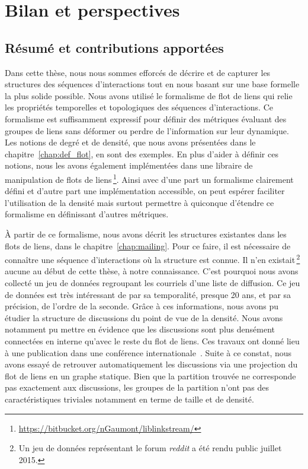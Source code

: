 \chapter{Bilan et perspectives}
\label{Conclusion}

\section{Résumé et contributions apportées}

Dans cette thèse, nous nous sommes efforcés de décrire et de capturer les structures des séquences d'interactions tout en nous basant sur une base formelle la plus solide possible.
Nous avons utilisé le formalisme de flot de liens qui relie les propriétés temporelles et topologiques des séquences d'interactions.
Ce formalisme est suffisamment expressif pour définir des métriques évaluant des groupes de liens sans déformer ou perdre de l'information sur leur dynamique.
Les notions de degré et de densité, que nous avons présentées dans le chapitre~\ref{chap:def_flot}, en sont des exemples.
En plus d'aider à définir ces notions, nous les avons également implémentées dans une libraire de manipulation de flots de liens\,\footnote{\url{https://bitbucket.org/nGaumont/liblinkstream/}}.
Ainsi avec d'une part un formalisme clairement défini et d'autre part une implémentation accessible, on peut espérer faciliter l'utilisation de la densité mais surtout permettre à quiconque d'étendre ce formalisme en définissant d'autres métriques.

\`A partir de ce formalisme, nous avons décrit les structures existantes dans les flots de liens, dans le chapitre~\ref{chap:mailing}.
Pour ce faire, il est nécessaire de connaître une séquence d'interactions où la structure est connue.
Il n'en existait\,\footnote{Un jeu de données représentant le forum \emph{reddit} a été rendu public juillet 2015.} aucune au début de cette thèse, à notre connaissance.
C'est pourquoi nous avons collecté un jeu de données regroupant les courriels d'une liste de diffusion.
Ce jeu de données est très intéressant de par sa temporalité, presque 20 ans, et par sa précision, de l'ordre de la seconde.
Grâce à ces informations, nous avons pu étudier la structure de discussions du point de vue de la densité.
Nous avons notamment pu mettre en évidence que les discussions sont plus densément connectées en interne qu'avec le reste du flot de liens.
Ces travaux ont donné lieu à une publication dans une conférence internationale~\cite{Gaumont2016}.
Suite à ce constat, nous avons essayé de retrouver automatiquement les discussions via une projection du flot de liens en un graphe statique.
Bien que la partition trouvée ne corresponde pas exactement aux discussions, les groupes de la partition n'ont pas des caractéristiques triviales notamment en terme de taille et de densité.


